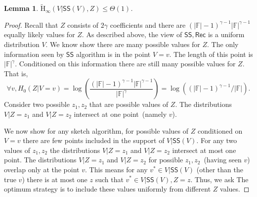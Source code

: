 \documentclass[11pt]{article}
\newcommand{\class}[1]{{\ensuremath{\mathsf{#1}}}}
\newcommand{\sketch}{\ensuremath{\class{SS}}\xspace}
\newcommand{\rec}{\ensuremath{\class{Rec}}\xspace}
\newcommand{\Hav}{\tilde{\mathrm{H}}_\infty}
\newtheorem{lemma}[theorem]{Lemma}
\begin{document}
\begin{lemma}
\label{lem:side info determines sketch}
$\Hav(V | \sketch(V), Z) \le \Theta(1)$.
\end{lemma}
\begin{proof}
Recall that $Z$ consists of $2\gamma$ coefficients and there are $(|\mathbb{F}|-1)^{\gamma-1} |\mathbb{F}|^{\gamma-1}$ equally likely values for $Z$.
 As described above, the view of $\sketch, \rec$ is a uniform distribution $V$.  We know show there are many possible values for $Z$.  The only information seen by $\sketch$ algorithm is in the point $V=v$.  The length of this point is $|\mathbb{F}|^\gamma$.  Conditioned on this information there are still many possible values for $Z$.  That is, 
 \[
 \forall v, H_0(Z | V=v) =\log \left(\frac{(|\mathbb{F}|-1)^{\gamma-1} |\mathbb{F}|^{\gamma-1}}{|\mathbb{F}|^\gamma}\right) = \log \left( (|\mathbb{F}|-1)^{\gamma-1}/|\mathbb{F}|\right).
 \]
Consider two possible $z_1, z_2$ that are possible values of $Z$.  The distributions $V| Z=z_1$ and $V | Z=z_2$ intersect at one point~(namely $v$).  

We now show for any sketch algorithm, for possible values of $Z$ conditioned on $V=v$ there are few points included in the support of $V |\sketch(V)$.  For any two values of $z_1, z_2$ the distributions $V| Z= z_1$ and $V | Z=z_2$ intersect at most one point.  The distributions $V | Z=z_1$ and $V| Z=z_2$ for possible $z_1, z_2$~(having seen $v$) overlap only at the point $v$.  This means for any $v^*\in V| \sketch(V)$ (other than the true $v$) there is at most one $z$ such that $v^*\in V | \sketch(V), Z=z$.  Thus, we ask The optimum strategy is to include these values uniformly from different $Z$ values.


\end{proof}
\end{document}
